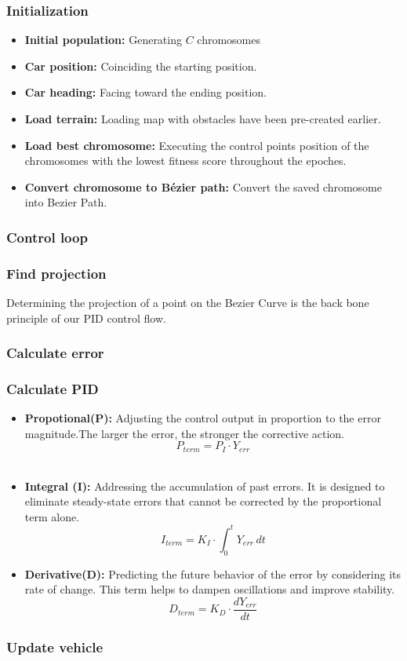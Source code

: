     \subsubsection{Initialization}
    \begin{itemize}
      \item \textbf{Initial population:} Generating $C$ chromosomes 
      \item \textbf{Car position:} Coinciding the starting position.
      \item \textbf{Car heading:} Facing toward the ending position.
      \item \textbf{Load terrain:} Loading map with obstacles have been pre-created earlier.
      \item \textbf{Load best chromosome:} Executing the control points position of the chromosomes with the lowest fitness score throughout the epoches.
      \item \textbf{Convert chromosome to Bézier path:} Convert the saved chromosome into Bezier Path.
    \end{itemize}
    \subsubsection{Control loop}
    \subsubsection*{Find projection}
    Determining the projection of a point on the Bezier Curve is the back bone principle of our PID control flow.

    \subsubsection*{Calculate error}
    \subsubsection*{Calculate PID}
    \begin{itemize}
      \item \textbf{Propotional(P):} Adjusting the control output in proportion to the error magnitude.The larger the error, the stronger the corrective action.\\
        $$P_{term}=P_I \cdot Y_{err}$$\\
      \item \textbf{Integral (I):} Addressing the accumulation of past errors. It is designed to eliminate steady-state errors that cannot be corrected by the proportional term alone.\\
        $$I_{term} = K_I \cdot \int_{0}^{t} Y_{err} \, dt$$
      \item \textbf{Derivative(D):} Predicting the future behavior of the error by considering its rate of change. This term helps to dampen oscillations and improve stability.\\
        $$D_{term} = K_D\cdot\frac{d Y_{err}}{dt}$$    
    \end{itemize}
    \subsubsection*{Update vehicle}
